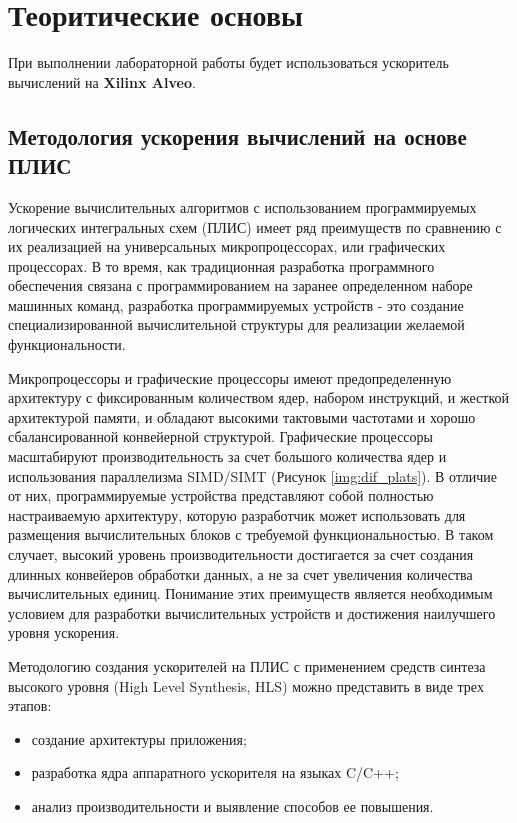 \chapter{Теоритические основы}
При выполнении лабораторной работы будет использоваться ускоритель вычислений на \textbf{Xilinx Alveo}.

\section{Методология ускорения вычислений на основе ПЛИС}

Ускорение вычислительных алгоритмов с использованием программируемых логических интегральных схем (ПЛИС) имеет ряд преимуществ по сравнению с их реализацией на универсальных микропроцессорах, или графических процессорах. В то время, как традиционная разработка программного обеспечения связана с программированием на заранее определенном наборе машинных команд, разработка программируемых устройств - это создание специализированной вычислительной структуры для реализации желаемой функциональности.


Микропроцессоры и графические процессоры имеют предопределенную архитектуру с фиксированным количеством ядер, набором инструкций, и жесткой архитектурой памяти, и обладают высокими тактовыми частотами и хорошо сбалансированной конвейерной структурой. Графические процессоры масштабируют производительность за счет большого количества ядер и использования параллелизма SIMD/SIMT (Рисунок \ref{img:dif_plats}). В отличие от них, программируемые устройства представляют собой полностью настраиваемую архитектуру, которую разработчик может использовать для размещения вычислительных блоков с требуемой функциональностью. В таком случает, высокий уровень производительности достигается за счет создания длинных конвейеров обработки данных, а не за счет увеличения количества вычислительных единиц. Понимание этих преимуществ является необходимым условием для разработки вычислительных устройств и достижения наилучшего уровня ускорения.


\clearpage

Методологию создания ускорителей на ПЛИС с применением средств синтеза высокого уровня (High Level Synthesis, HLS) можно представить в виде трех этапов:

\begin{itemize}
	\item создание архитектуры приложения;
	\item разработка ядра аппаратного ускорителя на языках C/C++;
	\item анализ производительности и выявление способов ее повышения.
\end{itemize}


